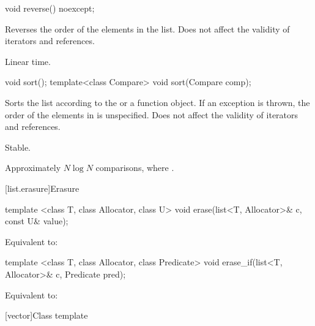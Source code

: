 %
\begin{itemdecl}
void reverse() noexcept;
\end{itemdecl}

\begin{itemdescr}
\pnum
\effects
Reverses the order of the elements in the list.
Does not affect the validity of iterators and references.

\pnum
\complexity
Linear time.
\end{itemdescr}

%
\begin{itemdecl}
void sort();
template<class Compare> void sort(Compare comp);
\end{itemdecl}

\begin{itemdescr}
\pnum
\effects
Sorts the list according to the  or a  function object.
If an exception is thrown,
the order of the elements in  is unspecified.
Does not affect the validity of iterators and references.

\pnum
\remarks Stable.

\pnum
\complexity
Approximately
$N \log N$
comparisons, where
.
\end{itemdescr}

[list.erasure]{Erasure}

%
\begin{itemdecl}
template <class T, class Allocator, class U>
  void erase(list<T, Allocator>& c, const U& value);
\end{itemdecl}

\begin{itemdescr}
\pnum
\effects
Equivalent to: 
\end{itemdescr}

%
\begin{itemdecl}
template <class T, class Allocator, class Predicate>
  void erase_if(list<T, Allocator>& c, Predicate pred);
\end{itemdecl}

\begin{itemdescr}
\pnum
\effects
Equivalent to: 
\end{itemdescr}

[vector]{Class template }

